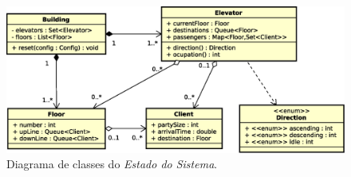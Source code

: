\begin{figure}[htb!]
  \centering
  \includegraphics[scale=0.6]{img/Model.eps}
  \caption{Diagrama de classes do \textit{Estado do Sistema}.}
\label{fig:diagram:model}
\end{figure}

